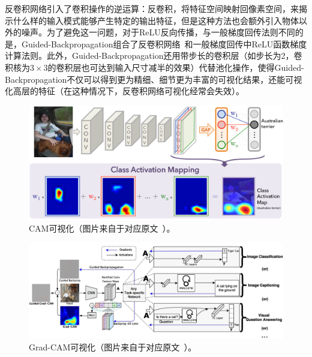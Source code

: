 反卷积网络引入了卷积操作的逆运算：反卷积，将特征空间映射回像素空间，来揭示什么样的输入模式能够产生特定的输出特征，但是这种方法也会额外引入物体以外的噪声。为了避免这一问题，对于ReLU反向传播，与一般梯度回传法则不同的是，Guided-Backpropagation组合了反卷积网络~\cite{zeiler2010deconvolutional}和一般梯度回传中ReLU函数梯度计算法则。此外，Guided-Backpropagation还用带步长的卷积层（如步长为2，卷积核为$3\times 3$的卷积层也可达到输入尺寸减半的效果）代替池化操作，使得Guided-Backpropagation不仅可以得到更为精细、细节更为丰富的可视化结果，还能可视化高层的特征（在这种情况下，反卷积网络可视化经常会失效）。
\begin{figure}[h]
	\centering
	\includegraphics[width=1.0\textwidth]{figure/cam_arichitecture}
	\caption[CAM可视化]{CAM可视化（图片来自于对应原文~\cite{zhou2016learning}）。}
	\label{fig:cam_arichitecture}
\end{figure}
\begin{figure}[h]
	\centering
	\includegraphics[width=1.0\textwidth]{figure/grad_cam_architecture}
	\caption[Grad-CAM可视化]{Grad-CAM可视化（图片来自于对应原文~\cite{selvaraju2017grad}）。}
	\label{fig:grad_cam_architecture}
\end{figure}
